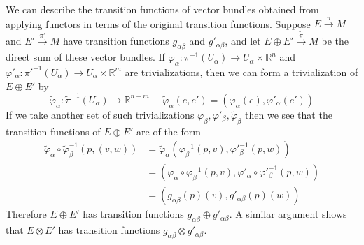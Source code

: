 We can describe the transition functions of vector bundles obtained from applying functors in terms of the original transition functions. Suppose $E \stackrel{\pi}{\rightarrow} M$ and $E' \stackrel{\pi'}{\rightarrow} M$ have transition functions $g_{\alpha\beta}$ and $g'_{\alpha\beta}$, and let $E \oplus E' \stackrel{\tilde\pi}{\rightarrow} M$ be the direct sum of these vector bundles. If $\varphi_\alpha : \pi^{-1}(U_\alpha) \rightarrow U_\alpha \times \mathbb R^n$ and $\varphi'_\alpha : \pi'^{-1}(U_\alpha) \rightarrow U_\alpha \times \mathbb R^m$ are trivializations, then we can form a trivialization of $E \oplus E'$ by
\[ \tilde\varphi_\alpha : \tilde\pi^{-1}(U_\alpha) \rightarrow \mathbb R^{n+m} \ \ \ \ \ \ \tilde\varphi_\alpha(e,e') = (\varphi_\alpha(e),\varphi'_\alpha(e')) \]
If we take another set of such trivializations $\varphi_\beta,\varphi'_\beta,\tilde\varphi_\beta$ then we see that the transition functions of $E \oplus E'$ are of the form
\begin{align*}
	\tilde\varphi_\alpha \circ \tilde\varphi_\beta^{-1}(p,(v,w)) &= \tilde\varphi_\alpha(\varphi_\beta^{-1}(p,v),\varphi'^{-1}_\beta(p,w)) \\
	                                                             &= (\varphi_\alpha \circ \varphi_\beta^{-1}(p,v), \varphi'_\alpha \circ \varphi'^{-1}_\beta(p,w)) \\
	                                                             &= (g_{\alpha\beta}(p)(v), g'_{\alpha\beta}(p)(w))
\end{align*}
Therefore $E \oplus E'$ has transition functions $g_{\alpha\beta} \oplus g'_{\alpha\beta}$. A similar argument shows that $E \otimes E'$ has transition functions $g_{\alpha\beta} \otimes g'_{\alpha\beta}$.

